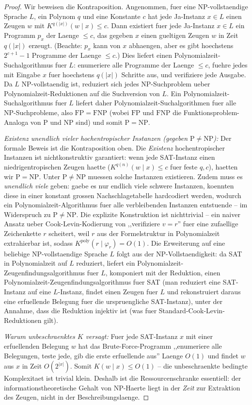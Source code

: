 \documentclass[aps,prd,twocolumn,superscriptaddress,nofootinbib]{revtex4-2}
\theoremstyle{definition}
\theoremstyle{remark}
\DeclareMathOperator{\poly}{poly}
\newcommand{\NP}{\mathrm{NP}}
\newcommand{\PP}{\mathrm{P}}
\begin{document}
\begin{proof}
Wir beweisen die Kontraposition. Angenommen, fuer eine NP-vollstaendige Sprache $L$, ein Polynom $q$ und eine Konstante $c$ hat jede Ja-Instanz $x \in L$ einen Zeugen $w$ mit $K^{q(|x|)}(w \mid x) \leq c$. Dann existiert fuer jede Ja-Instanz $x \in L$ ein Programm $p_x$ der Laenge $\leq c$, das gegeben $x$ einen gueltigen Zeugen $w$ in Zeit $q(|x|)$ erzeugt. (Beachte: $p_x$ kann von $x$ abhaengen, aber es gibt hoechstens $2^{c+1} - 1$ Programme der Laenge $\leq c$.) Dies liefert einen Polynomialzeit-Suchalgorithmus fuer $L$: enumeriere alle Programme der Laenge $\leq c$, fuehre jedes mit Eingabe $x$ fuer hoechstens $q(|x|)$ Schritte aus, und verifiziere jede Ausgabe. Da $L$ NP-vollstaendig ist, reduziert sich jedes NP-Suchproblem ueber Polynomialzeit-Reduktionen auf die Suchversion von $L$. Ein Polynomialzeit-Suchalgorithmus fuer $L$ liefert daher Polynomialzeit-Suchalgorithmen fuer alle NP-Suchprobleme, also $\mathrm{FP} = \mathrm{FNP}$ (wobei $\mathrm{FP}$ und $\mathrm{FNP}$ die Funktionsproblem-Analoga von $\PP$ und $\NP$ sind) und somit $\PP = \NP$.

\textit{Existenz unendlich vieler hochentropischer Instanzen (gegeben $\PP \neq \NP$):} Der formale Beweis ist die Kontraposition oben. Die \textit{Existenz} hochentropischer Instanzen ist nichtkonstruktiv garantiert: wenn jede SAT-Instanz einen niedrigentropischen Zeugen haette ($K^{q(n)}(w \mid x) \leq c$ fuer feste $q, c$), haetten wir $\PP = \NP$. Unter $\PP \neq \NP$ muessen solche Instanzen existieren. Zudem muss es \textit{unendlich viele} geben: gaebe es nur endlich viele schwere Instanzen, koennten diese in einer konstant grossen Nachschlagetabelle hardcodiert werden, wodurch ein Polynomialzeit-Algorithmus fuer alle verbleibenden Instanzen entstuende -- im Widerspruch zu $\PP \neq \NP$. Die explizite Konstruktion ist nichttrivial -- ein naiver Ansatz ueber Cook-Levin-Kodierung von ,,verifiziere $v = r$'' fuer eine zufaellige Zeichenkette $r$ scheitert, weil $r$ aus der Formelstruktur in Polynomialzeit extrahierbar ist, sodass $K^{\poly}(r \mid \varphi_r) = O(1)$. Die Erweiterung auf eine beliebige NP-vollstaendige Sprache $L$ folgt aus der NP-Vollstaendigkeit: da SAT in Polynomialzeit auf $L$ reduziert, liefert ein Polynomialzeit-Zeugenfindungsalgorithmus fuer $L$, komponiert mit der Reduktion, einen Polynomialzeit-Zeugenfindungsalgorithmus fuer SAT (man reduziert eine SAT-Instanz auf eine $L$-Instanz, findet einen Zeugen fuer $L$ und rekonstruiert daraus eine erfuellende Belegung fuer die urspruengliche SAT-Instanz), unter der Annahme, dass die Reduktion injektiv ist (was fuer Standard-Cook-Levin-Reduktionen gilt).

\textit{Warum unbeschraenktes $K$ versagt:} Fuer jede SAT-Instanz $x$ mit einer erfuellenden Belegung $w$ hat das Brute-Force-Programm ,,enumeriere alle Belegungen, teste jede, gib die erste erfuellende aus'' Laenge $O(1)$ und findet $w$ aus $x$ in Zeit $O(2^{|x|})$. Somit $K(w \mid x) \leq O(1)$ -- die unbeschraenkte bedingte Komplexitaet ist trivial klein. Deshalb ist die Ressourcenschranke essentiell: der informationstheoretische Gehalt von NP-Haerte liegt in der \textit{Zeit} zur Extraktion des Zeugen, nicht in der Beschreibungslaenge.
\end{proof}
\end{document}

